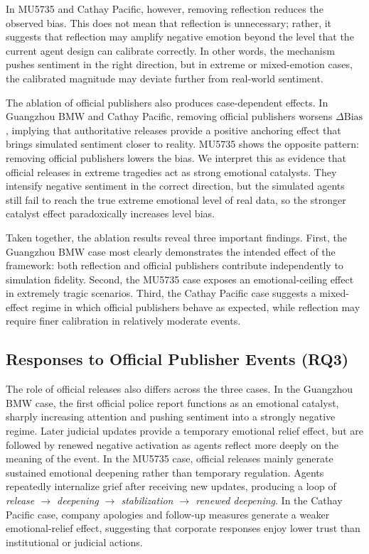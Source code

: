 In MU5735 and Cathay Pacific, however, removing reflection reduces the observed bias. This does not mean that reflection is unnecessary; rather, it suggests that reflection may amplify negative emotion beyond the level that the current agent design can calibrate correctly. In other words, the mechanism pushes sentiment in the right direction, but in extreme or mixed-emotion cases, the calibrated magnitude may deviate further from real-world sentiment.

The ablation of official publishers also produces case-dependent effects. In Guangzhou BMW and Cathay Pacific, removing official publishers worsens \(\Delta\mathrm{Bias}\), implying that authoritative releases provide a positive anchoring effect that brings simulated sentiment closer to reality. MU5735 shows the opposite pattern: removing official publishers lowers the bias. We interpret this as evidence that official releases in extreme tragedies act as strong emotional catalysts. They intensify negative sentiment in the correct direction, but the simulated agents still fail to reach the true extreme emotional level of real data, so the stronger catalyst effect paradoxically increases level bias.

Taken together, the ablation results reveal three important findings. First, the Guangzhou BMW case most clearly demonstrates the intended effect of the framework: both reflection and official publishers contribute independently to simulation fidelity. Second, the MU5735 case exposes an emotional-ceiling effect in extremely tragic scenarios. Third, the Cathay Pacific case suggests a mixed-effect regime in which official publishers behave as expected, while reflection may require finer calibration in relatively moderate events.

\subsection{Responses to Official Publisher Events (RQ3)}

The role of official releases also differs across the three cases. In the Guangzhou BMW case, the first official police report functions as an emotional catalyst, sharply increasing attention and pushing sentiment into a strongly negative regime. Later judicial updates provide a temporary emotional relief effect, but are followed by renewed negative activation as agents reflect more deeply on the meaning of the event. In the MU5735 case, official releases mainly generate sustained emotional deepening rather than temporary regulation. Agents repeatedly internalize grief after receiving new updates, producing a loop of \emph{release \(\rightarrow\) deepening \(\rightarrow\) stabilization \(\rightarrow\) renewed deepening}. In the Cathay Pacific case, company apologies and follow-up measures generate a weaker emotional-relief effect, suggesting that corporate responses enjoy lower trust than institutional or judicial actions.

